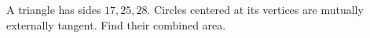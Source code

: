 A triangle has sides $17,25,28$. Circles centered at its vertices are mutually externally tangent. Find their combined area.
